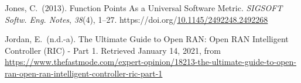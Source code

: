 \documentclass[12pt,twoside]{article}
\begin{document}
{\begin{thebibliography}{1079}
\mdbibitemlabel{}Jones, C.~(2013). Function Points As a Universal Software Metric. \emph{SIGSOFT Softw. Eng. Notes}, \emph{38}(4), 1–27. https://doi.org/\href{https://dx.doi.org/10.1145/2492248.2492268}{10.1145/2492248.2492268}%

\mdbibitemlabel{}Jordan, E.~(n.d.-a). The Ultimate Guide to Open RAN: Open RAN Intelligent Controller (RIC) - Part 1. Retrieved January 14, 2021, from \href{https://www.thefastmode.com/expert-opinion/18213-the-ultimate-guide-to-open-ran-open-ran-intelligent-controller-ric-part-1}{{\ttfamily https://\hspace{0pt}www.\hspace{0pt}thefastmode.\hspace{0pt}com/\hspace{0pt}expert-\hspace{0pt}opinion/\hspace{0pt}18213-\hspace{0pt}the-\hspace{0pt}ultimate-\hspace{0pt}guide-\hspace{0pt}to-\hspace{0pt}open-\hspace{0pt}ran-\hspace{0pt}open-\hspace{0pt}ran-\hspace{0pt}intelligent-\hspace{0pt}controller-\hspace{0pt}ric-\hspace{0pt}part-\hspace{0pt}1}}%


\end{thebibliography}}
\end{document}
